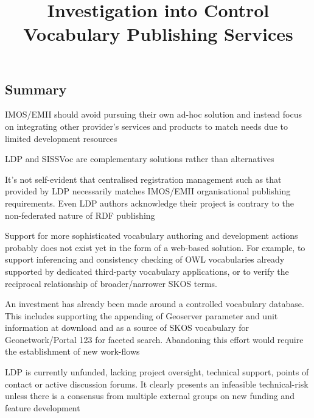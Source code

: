 \documentclass[10pt,a4paper]{article}
\title{Investigation into Control Vocabulary Publishing Services}
\date{}
\newenvironment{italicquotes}
{\begin{quote}\itshape}
{\end{quote}}
\let\Item\item
\newcommand\SpecialItem{\renewcommand\item[1][]{\Item[\textbullet~\bfseries##1]}}
\begin{document}
\SpecialItem

  \maketitle
    \begin{flushleft}



% 
% 



\section{
	Summary
}

\item[] IMOS/EMII should avoid pursuing their own ad-hoc solution and instead 
focus on integrating other provider's services and products to match needs due 
to limited development resources
\item[] LDP and SISSVoc are complementary solutions rather than alternatives
\item[] It's not self-evident that centralised registration management such as 
that provided by LDP necessarily matches IMOS/EMII organisational publishing 
requirements. Even LDP authors acknowledge their project is contrary to the 
non-federated nature of RDF publishing
\item[] Support for more sophisticated vocabulary authoring and development 
actions probably does not exist yet in the form of a web-based solution. For 
example, to support inferencing and consistency checking of OWL vocabularies already 
supported by dedicated third-party vocabulary applications, or to verify the 
reciprocal relationship of broader/narrower SKOS terms.
\item[] An investment has already been made around a controlled vocabulary 
database. This includes supporting the appending of Geoserver parameter and 
unit information at download and 
as a source of SKOS vocabulary for Geonetwork/Portal 123 for faceted search. 
Abandoning this effort would require the establishment of new work-flows
\item[] LDP is currently unfunded, lacking project oversight, technical 
support, points of contact or active discussion forums. It clearly presents an infeasible technical-risk 
unless there is a consensus from multiple external groups on new funding and 
feature development 



\end{flushleft}
\end{document}
